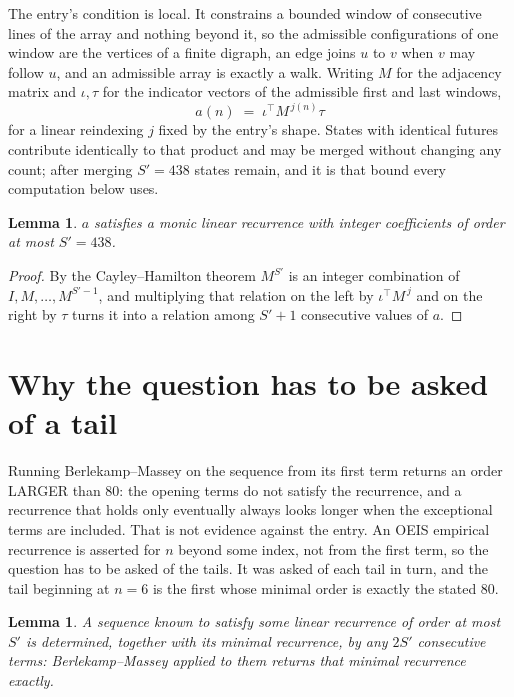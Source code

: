\documentclass[11pt,a4paper]{article}
\theoremstyle{plain}
\newtheorem{lemma}[theorem]{Lemma}
\theoremstyle{definition}
\begin{document}
The entry's condition is local. It constrains a bounded window of consecutive lines of the
array and nothing beyond it, so the admissible configurations of one window are the vertices of
a finite digraph, an edge joins $u$ to $v$ when $v$ may follow $u$, and an admissible array is
exactly a walk. Writing $M$ for the adjacency matrix and $\iota,\tau$ for the indicator vectors
of the admissible first and last windows,
\[
a(n)\;=\;\iota^{\!\top}M^{\,j(n)}\tau
\]
for a linear reindexing $j$ fixed by the entry's shape. States with identical futures
contribute identically to that product and may be merged without changing any count; after
merging $S'=438$ states remain, and it is that bound every computation below uses.

\begin{lemma}\label{lem:cf}
$a$ satisfies a monic linear recurrence with integer coefficients of order at most $S'=438$.
\end{lemma}

\begin{proof}
By the Cayley--Hamilton theorem $M^{S'}$ is an integer combination of $I,M,\dots,M^{S'-1}$,
and multiplying that relation on the left by $\iota^{\!\top}M^{\,j}$ and on the right by
$\tau$ turns it into a relation among $S'+1$ consecutive values of $a$.
\end{proof}

\section{Why the question has to be asked of a tail}

Running Berlekamp--Massey on the sequence from its first term returns an order LARGER than $80$: the opening terms do not satisfy the recurrence, and a recurrence that holds only eventually always looks longer when the exceptional terms are included. That is not evidence against the entry. An OEIS empirical recurrence is asserted for $n$ beyond some index, not from the first term, so the question has to be asked of the tails. It was asked of each tail in turn, and the tail beginning at $n=6$ is the first whose minimal order is exactly the stated $80$.

\begin{lemma}\label{lem:bm}
A sequence known to satisfy some linear recurrence of order at most $S'$ is determined,
together with its minimal recurrence, by any $2S'$ consecutive terms: Berlekamp--Massey applied
to them returns that minimal recurrence exactly.
\end{lemma}
\end{document}
